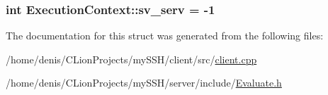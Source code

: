\subsubsection[{\texorpdfstring{sv\+\_\+serv}{sv_serv}}]{\setlength{\rightskip}{0pt plus 5cm}int Execution\+Context\+::sv\+\_\+serv = -\/1}\hypertarget{structExecutionContext_aac8fa1ea0b889137efab488cb650cca1}{}\label{structExecutionContext_aac8fa1ea0b889137efab488cb650cca1}


The documentation for this struct was generated from the following files\+:\begin{DoxyCompactItemize}
\item 
/home/denis/\+C\+Lion\+Projects/my\+S\+S\+H/client/src/\hyperlink{client_8cpp}{client.\+cpp}\item 
/home/denis/\+C\+Lion\+Projects/my\+S\+S\+H/server/include/\hyperlink{Evaluate_8h}{Evaluate.\+h}\end{DoxyCompactItemize}
